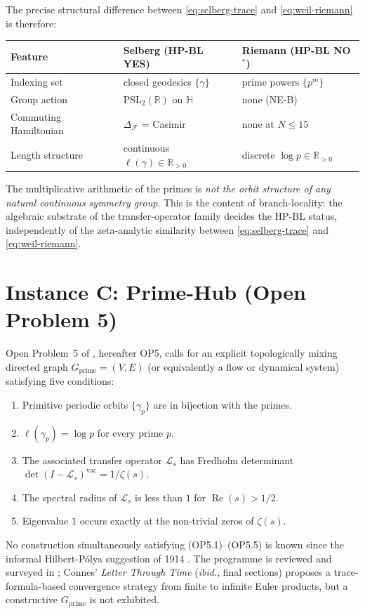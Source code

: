 \documentclass[11pt]{article}
\theoremstyle{definition}
\theoremstyle{remark}
\newcommand{\PSL}{\mathrm{PSL}}
\renewcommand{\Re}{\operatorname{Re}}
\begin{document}
The precise structural difference between
\eqref{eq:selberg-trace} and \eqref{eq:weil-riemann} is therefore:
\begin{center}
\begin{tabular}{@{}lll@{}}
\toprule
Feature & Selberg (HP-BL YES) & Riemann (HP-BL NO${}^*$) \\
\midrule
Indexing set & closed geodesics $\{\gamma\}$ &
  prime powers $\{p^m\}$ \\
Group action & $\PSL_2(\mathbb{R})$ on $\mathbb{H}$ & none (NE-B) \\
Commuting Hamiltonian & $\Delta_\mathcal{F}$ = Casimir & none at $N \leq 15$ \\
Length structure & continuous $\ell(\gamma) \in \mathbb{R}_{>0}$ &
  discrete $\log p \in \mathbb{R}_{>0}$ \\
\bottomrule
\end{tabular}
\end{center}

The multiplicative arithmetic of the primes is \emph{not the orbit
structure of any natural continuous symmetry group}. This is the
content of branch-locality: the algebraic substrate of the
transfer-operator family decides the HP-BL status, independently
of the zeta-analytic similarity between \eqref{eq:selberg-trace}
and \eqref{eq:weil-riemann}.

\section{Instance C: Prime-Hub (Open Problem 5)}
\label{sec:primehub}

Open Problem~5 of \cite{Geiger2026RHIII}, hereafter OP5, calls for an
explicit topologically mixing directed graph
$G_\mathrm{prime} = (V, E)$ (or equivalently a flow or dynamical system)
satisfying five conditions:
\begin{enumerate}
\item[(OP5.1)] Primitive periodic orbits $\{\gamma_p\}$ are in
  bijection with the primes.
\item[(OP5.2)] $\ell(\gamma_p) = \log p$ for every prime $p$.
\item[(OP5.3)] The associated transfer operator $\mathcal{L}_s$ has
  Fredholm determinant $\det(I - \mathcal{L}_s)^{\mathrm{vac}} =
  1/\zeta(s)$.
\item[(OP5.4)] The spectral radius of $\mathcal{L}_s$ is less than $1$
  for $\Re(s) > 1/2$.
\item[(OP5.5)] Eigenvalue $1$ occurs exactly at the non-trivial zeros
  of $\zeta(s)$.
\end{enumerate}
No construction simultaneously satisfying (OP5.1)--(OP5.5) is known
since the informal Hilbert-P\'olya suggestion of 1914
\cite{Polya1982letter}. The programme is reviewed and surveyed in
\cite{Connes2026}; Connes' \emph{Letter Through Time} (\emph{ibid.},
final sections) proposes a trace-formula-based convergence strategy
from finite to infinite Euler products, but a constructive
$G_\mathrm{prime}$ is not exhibited.
\end{document}

